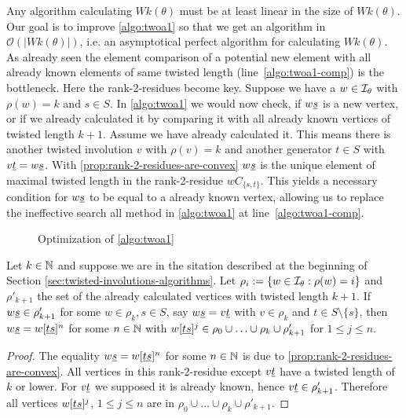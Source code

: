 Any algorithm calculating $Wk(\theta)$ must be at least linear in the size of $Wk(\theta)$. Our goal is to improve \ref{algo:twoa1} so that we get an algorithm in $\mathcal{O}(|Wk(\theta)|)$, i.e. an asymptotical perfect algorithm for calculating $Wk(\theta)$. As already seen the element comparison of a potential new element with all already known elements of same twisted length (line~\ref{algo:twoa1-comp}) is the bottleneck. Here the rank-2-residues become key. Suppose we have a $w \in \mathcal{I}_{\theta}$ with $\rho(w) = k$ and $s \in S$. In \ref{algo:twoa1} we would now check, if $w \underline{s}$ is a new vertex, or if we already calculated it by comparing it with all already known vertices of twisted length $k + 1$. Assume we have already calculated it. This means there is another twisted involution $v$ with $\rho(v) = k$ and another generator $t \in S$ with $v \underline{t} = w \underline{s}$. With \ref{prop:rank-2-residues-are-convex} $w \underline{s}$ is the unique element of maximal twisted length in the rank-2-residue $wC_{\{s,t\}}$. This yields a necessary condition for $w \underline{s}$ to be equal to a already known vertex, allowing us to replace the ineffective search all method in \ref{algo:twoa1} at line~\ref{algo:twoa1-comp}.

\begin{figure}[ht]
	\centering
	
	\caption{Optimization of \ref{algo:twoa1}}
	\label{fig:optimization-of-twoa1}
\end{figure}

\begin{lemm}
	Let $k \in \mathbb{N}$ and suppose we are in the sitation described at the beginning of Section \ref{sec:twisted-involutions-algorithms}. Let $\rho_i := \{ w \in \mathcal{I}_{\theta} : \rho(w) = i \}$ and $\rho'_{k+1}$ the set of the already calculated vertices with twisted length $k+1$. If $w \underline{s} \in \rho'_{k+1}$ for some $w \in \rho_k, s \in S$, say $w \underline{s} = v \underline{t}$ with $v \in \rho_k$ and $t \in S \setminus \{s\}$, then $w \underline{s} = w[\underline{t} \underline{s}]^n$ for some $n \in \mathbb{N}$ with $w[\underline{t} \underline{s}]^j \in \rho_0 \cup \ldots \cup \rho_k \cup \rho'_{k+1}$ for $1 \leq j \leq n$.

	\begin{proof}
		The equality $w \underline{s} = w[\underline{t} \underline{s}]^n$ for some $n \in \mathbb{N}$ is due to \ref{prop:rank-2-residues-are-convex}. All vertices in this rank-2-residue except $v \underline{t}$ have a twisted length of $k$ or lower. For $v \underline{t}$ we supposed it is already known, hence $v \underline{t} \in \rho'_{k+1}$. Therefore all vertices $w[\underline{t} \underline{s}]^j$, $1 \leq j \leq n$ are in $\rho_0 \cup \ldots \cup \rho_k \cup \rho'_{k+1}$.
	\end{proof}
\end{lemm}

